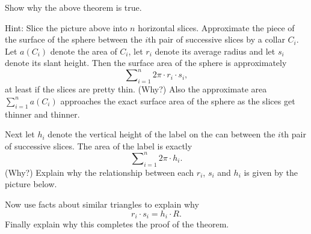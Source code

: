 \begin{exercise}
Show why the above theorem is true.

Hint: Slice the picture above into $n$ horizontal slices. Approximate
the piece of the surface of the sphere between the $i$th pair of
successive slices by a collar $C_{i}$. Let $a\left( C_{i}\right) $
denote the area of $C_{i}$, let $r_{i}$ denote its average radius and
let $s_{i}$ denote its slant height. Then the surface area of the
sphere is approximately%
\[%
{\displaystyle\sum\nolimits_{i=1}^{n}}
2\pi\cdot r_{i}\cdot s_{i},
\]
at least if the slices are pretty thin. (Why?) Also the approximate area $%
{\displaystyle\sum\nolimits_{i=1}^{n}}
a\left(  C_{i}\right)  $ approaches the exact surface area of the sphere as
the slices get thinner and thinner.

Next let $h_{i}$ denote the vertical height of the label on the can between
the $i$th pair of successive slices. The area of the label is exactly%
\[%
{\displaystyle\sum\nolimits_{i=1}^{n}}
2\pi\cdot h_{i}.
\]
(Why?) Explain why the relationship between each $r_{i}$, $s_{i}$ and $h_{i}$
is given by the picture below.
\begin{image}
\end{image}
Now use facts about similar triangles to explain why
\[
r_{i}\cdot s_{i}=h_{i}\cdot R.
\]
Finally explain why this completes the proof of the theorem.
\end{exercise}
